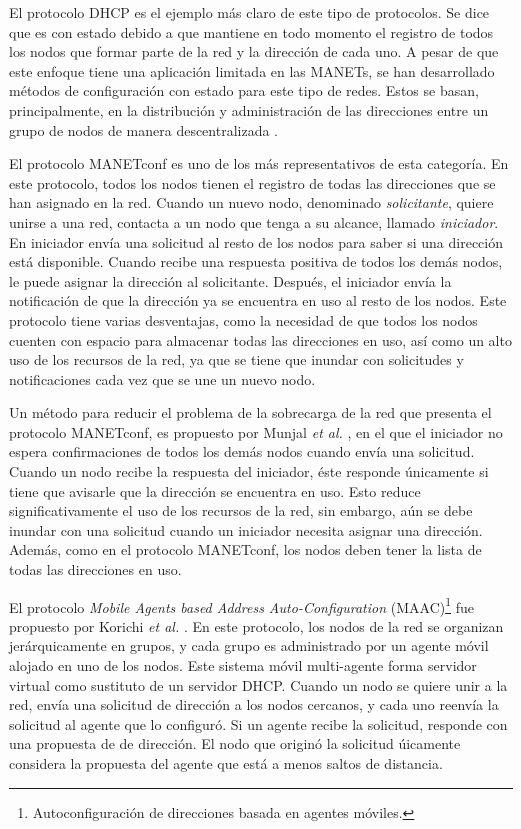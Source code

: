 \label{sec:autoconfiguracion_de_direcciones_con_estado}

El protocolo DHCP es el ejemplo más claro de este tipo de protocolos. Se dice
que es con estado debido a que mantiene en todo momento el registro de todos los
nodos que formar parte de la red y la dirección de cada uno. A pesar de que este
enfoque tiene una aplicación limitada en las MANETs, se han desarrollado
métodos de configuración con estado para este tipo de redes. Estos se basan,
principalmente, en la distribución y administración de las direcciones entre un
grupo de nodos de manera descentralizada \cite{Grajzer2019}.

El protocolo MANETconf \cite{Nesargi2002} es uno de los más representativos de
esta categoría. En este protocolo, todos los nodos tienen el registro de todas
las direcciones que se han asignado en la red. Cuando un nuevo nodo, denominado
\textit{solicitante}, quiere unirse a una red, contacta a un nodo que tenga a su
alcance, llamado \textit{iniciador}. En iniciador envía una solicitud al resto
de los nodos para saber si una dirección está disponible. Cuando recibe una
respuesta positiva de todos los demás nodos, le puede asignar la dirección al
solicitante. Después, el iniciador envía la notificación de que la dirección ya
se encuentra en uso al resto de los nodos. Este protocolo tiene varias
desventajas, como la necesidad de que todos los nodos cuenten con espacio para
almacenar todas las direcciones en uso, así como un alto uso de los recursos de
la red, ya que se tiene que inundar con solicitudes y notificaciones cada vez
que se une un nuevo nodo.

Un método para reducir el problema de la sobrecarga de la red que presenta el
protocolo MANETconf, es propuesto por Munjal \textit{et al.} \cite{Munjal2014},
en el que el iniciador no espera confirmaciones de todos los demás nodos cuando
envía una solicitud. Cuando un nodo recibe la respuesta del iniciador, éste
responde únicamente si tiene que avisarle que la dirección se encuentra en uso.
Esto reduce significativamente el uso de los recursos de la red, sin embargo,
aún se debe inundar con una solicitud cuando un iniciador necesita asignar una
dirección. Además, como en el protocolo MANETconf, los nodos deben tener la
lista de todas las direcciones en uso.

El protocolo \textit{Mobile Agents based Address Auto-Configuration}
(MAAC)\footnote{Autoconfiguración de direcciones basada en agentes móviles.} fue
propuesto por Korichi \textit{et al.} \cite{Korichi2018}. En este protocolo,
los nodos de la red se organizan jerárquicamente en grupos, y cada grupo es
administrado por un agente móvil alojado en uno de los nodos. Este sistema
móvil multi-agente forma servidor virtual como sustituto de un servidor DHCP.
Cuando un nodo se quiere unir a la red, envía una solicitud de dirección a los
nodos cercanos, y cada uno reenvía la solicitud al agente que lo configuró. Si
un agente recibe la solicitud, responde con una propuesta de de dirección. El
nodo que originó la solicitud úicamente considera la propuesta del agente que
está a menos saltos de distancia.

